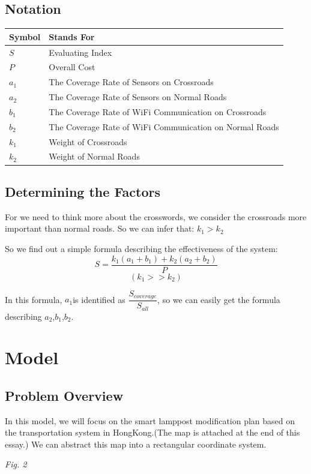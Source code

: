 \documentclass[12pt]{article}
\theoremstyle{definition}
\theoremstyle{remark}
\numberwithin{equation}{section}
\begin{document}
		\subsection{Notation}
		\begin{tabular}{ll}
		\hline
		Symbol&Stands For\\
		\hline
		$S$&Evaluating Index\\
		$P$&Overall Cost\\
		$a_1$&The Coverage Rate of Sensors on Crossroads\\
		$a_2$&The Coverage Rate of Sensors on Normal Roads\\
		$b_1$&The Coverage Rate of WiFi Communication on Crossroads\\
		$b_2$&The Coverage Rate of WiFi Communication on Normal Roads\\
		$k_1$&Weight of Crossroads\\
		$k_2$&Weight of Normal Roads\\
		\hline
		\end{tabular}	
		\subsection{Determining the Factors}
		For we need to think more about the crosswords, we consider the crossroads more important than normal roads. So we can infer that:
		$k_1>k_2$
		
		So we find out a simple formula describing the effectiveness of the system:
		$$S=\dfrac{k_1(a_1+b_1)+k_2(a_2+b_2)}{P}$$
		$$\left(k_1>>k_2\right)$$
		
		In this formula, $a_1$is identified as $\dfrac{S_{coverage}}{S_{all}}$, so we can easily get the formula describing $a_2$,$b_1$,$b_2$.
		
	\newpage
	\section{Model}
		\subsection{Problem Overview}
		In this model, we will focus on the smart lamppost modification plan based on the transportation system in HongKong.(The map is attached at the end of this essay.) We can abstract this map into a rectangular coordinate system.
		\begin{center}
			\small \textit{Fig. 2}
		\end{center}
	
\end{document}

